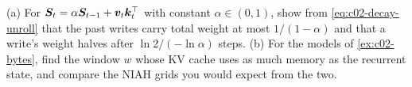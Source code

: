 \begin{exercise}\label{ex:c02-ex-budget}
(a) For $\bm{S}_t = \alpha\bm{S}_{t-1} + \bm{v}_t\bm{k}_t^{\top}$ with constant $\alpha\in(0,1)$, show from
\eqref{eq:c02-decay-unroll} that the past writes carry total weight at most $1/(1-\alpha)$ and that a
write's weight halves after $\ln 2/(-\ln\alpha)$ steps. (b) For the models of \cref{ex:c02-bytes},
find the window $w$ whose KV cache uses as much memory as the recurrent state, and compare the NIAH
grids you would expect from the two.
\end{exercise}

